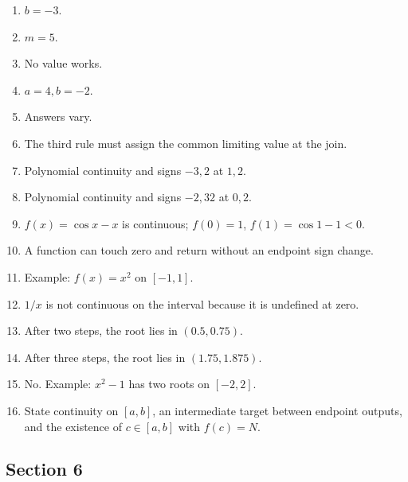 \documentclass[11pt,openany]{book}
\theoremstyle{bgplain}
\begin{document}
\begin{enumerate}[label=\textbf{5.\arabic*}]
  \item \(b=-3\).
  \item \(m=5\).
  \item No value works.
  \item \(a=4,b=-2\).
  \item Answers vary.
  \item The third rule must assign the common limiting value at the join.
  \item Polynomial continuity and signs \(-3,2\) at \(1,2\).
  \item Polynomial continuity and signs \(-2,32\) at \(0,2\).
  \item \(f(x)=\cos x-x\) is continuous; \(f(0)=1\), \(f(1)=\cos1-1<0\).
  \item A function can touch zero and return without an endpoint sign change.
  \item Example: \(f(x)=x^2\) on \([-1,1]\).
  \item \(1/x\) is not continuous on the interval because it is undefined at zero.
  \item After two steps, the root lies in \((0.5,0.75)\).
  \item After three steps, the root lies in \((1.75,1.875)\).
  \item No. Example: \(x^2-1\) has two roots on \([-2,2]\).
  \item State continuity on \([a,b]\), an intermediate target between endpoint outputs, and the existence of \(c\in[a,b]\) with \(f(c)=N\).
\end{enumerate}

\subsection*{Section 6}
\end{document}
